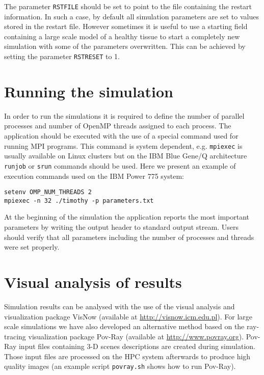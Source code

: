 \documentclass[10pt]{article}
\newenvironment{code}%
   {\snugshade\verbatim}%
   {\endverbatim\endsnugshade}
\begin{document}
\indent The parameter {\tt RSTFILE} should be set to point to the file containing the restart information. In such a case, by default all simulation parameters are set to values stored in the restart file. However sometimes it is useful to use a starting field containing a large scale model of a healthy tissue to start a completely new simulation with some of the parameters  overwritten. This can be achieved by setting the parameter {\tt RSTRESET} to 1.

\section{Running the simulation}

\indent In order to run the simulations it is required to define the number of parallel processes and number of OpenMP threads assigned to each process. The application should be executed with the use of a special command used for running MPI programs. This command is system dependent, e.g. {\tt mpiexec} is usually available on Linux clusters but on the IBM Blue Gene/Q architecture {\tt runjob} or {\tt srun} commands should be used. Here we present an example of execution commands used on the IBM Power 775 system:
\begin{verbatim}
setenv OMP_NUM_THREADS 2
mpiexec -n 32 ./timothy -p parameters.txt
\end{verbatim}

\indent At the beginning of the simulation the application reports the most important parameters by writing the output header to standard output stream. Users should verify that all parameters including the number of processes and threads were set properly. %



\section{Visual analysis of results}
Simulation results can be analysed with the use of the visual analysis and visualization package VisNow (available at \url{http://visnow.icm.edu.pl}). For large scale simulations we have also developed an alternative method based on the ray-tracing visualization package Pov-Ray (available at \url{http://www.povray.org}). Pov-Ray input files containing 3-D scenes descriptions are created during simulation. Those input files are processed on the HPC system afterwards to produce high quality images (an example script {\tt povray.sh} shows how to run Pov-Ray). 
\end{document}
